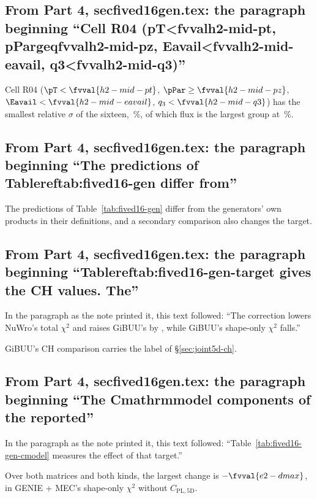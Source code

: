 \subsection{From Part 4, secfived16gen.tex: the paragraph beginning ``Cell R04 (pT<fvvalh2-mid-pt, pPargeqfvvalh2-mid-pz, Eavail<fvvalh2-mid-eavail, q3<fvvalh2-mid-q3)''}
Cell R04 ($\pT<\fvval{h2-mid-pt}$, $\pPar\geq\fvval{h2-mid-pz}$, $\Eavail<\fvval{h2-mid-eavail}$, $q_3<\fvval{h2-mid-q3}$) has the smallest relative $\sigma$ of the sixteen, \,\%, of which flux is the largest group at \,\%.

\subsection{From Part 4, secfived16gen.tex: the paragraph beginning ``The predictions of Tablereftab:fived16-gen differ from''}
The predictions of Table~\ref{tab:fived16-gen} differ from the generators' own products in their definitions, and a secondary comparison also changes the target.

\subsection{From Part 4, secfived16gen.tex: the paragraph beginning ``Tablereftab:fived16-gen-target gives the CH values. The''}
In the paragraph as the note printed it, this text followed: ``The correction lowers NuWro's total $\chi^2$ and raises GiBUU's by , while GiBUU's shape-only $\chi^2$ falls.''\par
GiBUU's CH comparison carries the label of \S\ref{sec:joint5d-ch}.

\subsection{From Part 4, secfived16gen.tex: the paragraph beginning ``The Cmathrmmodel components of the reported''}
In the paragraph as the note printed it, this text followed: ``Table~\ref{tab:fived16-gen-cmodel} measures the effect of that target.''\par
Over both matrices and both kinds, the largest change is $-\fvval{e2-dmax}$, in GENIE + MEC's shape-only $\chi^2$ without $C_{\mathrm{PL,5D}}$.


